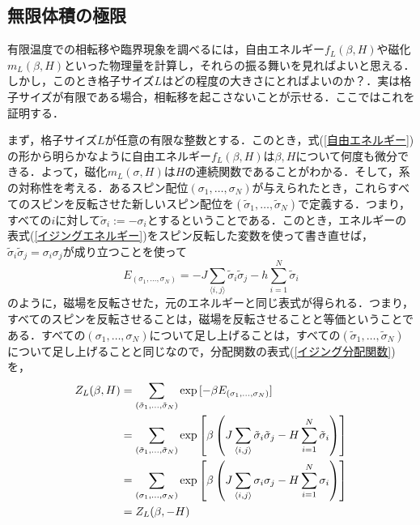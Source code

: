 \documentclass[a4paper,11pt]{jsreport}
\begin{document}
\subsection{無限体積の極限}
有限温度での相転移や臨界現象を調べるには，自由エネルギー$f_L(\beta, H)$や磁化$m_L(\beta, H)$といった物理量を計算し，それらの振る舞いを見ればよいと思える．しかし，このとき格子サイズ$L$はどの程度の大きさにとればよいのか？．実は格子サイズが有限である場合，相転移を起こさないことが示せる．ここではこれを証明する．\par
まず，格子サイズ$L$が任意の有限な整数とする．このとき，式(\ref{自由エネルギー})の形から明らかなように自由エネルギー$f_L(\beta, H)$は$\beta, H$について何度も微分できる．よって，磁化$m_L(\sigma, H)$は$H$の連続関数であることがわかる．そして，系の対称性を考える．あるスピン配位$(\sigma_1,\dots,\sigma_N)$が与えられたとき，これらすべてのスピンを反転させた新しいスピン配位を$(\tilde{\sigma}_1,\dots,\tilde{\sigma}_N)$で定義する．つまり，すべての$i$に対して$\tilde{\sigma}_i := -\sigma_i$とするということである．このとき，エネルギーの表式(\ref{イジングエネルギー})をスピン反転した変数を使って書き直せば，$\tilde{\sigma}_i \tilde{\sigma}_j = \sigma_i \sigma_j$が成り立つことを使って
\begin{equation}
  E_{(\sigma_1,\dots,\sigma_N)} = -J \sum_{\langle i,j \rangle} \tilde{\sigma}_i \tilde{\sigma}_j -h \sum_{i=1}^{N} \tilde{\sigma}_i
\end{equation}
のように，磁場を反転させた，元のエネルギーと同じ表式が得られる．つまり，すべてのスピンを反転させることは，磁場を反転させることと等価ということである．すべての$(\sigma_1,\dots,\sigma_N)$について足し上げることは，すべての$(\tilde{\sigma}_1,\dots,\tilde{\sigma}_N)$について足し上げることと同じなので，分配関数の表式(\ref{イジング分配関数})を，
\begin{align}
  Z_L(\beta, H)
   & = \sum_{(\tilde{\sigma}_1,\dots,\tilde{\sigma}_N)} \exp{[-\beta E_{(\sigma_1,\dots,\sigma_N)}]} \notag                                                                                               \\
   & = \sum_{(\tilde{\sigma}_1,\dots,\tilde{\sigma}_N)} \exp{\left[ \beta\left( J \sum_{\langle i,j \rangle} \tilde{\sigma}_i \tilde{\sigma}_j -H \sum_{i=1}^{N} \tilde{\sigma}_i \right) \right]} \notag \\
   & = \sum_{(\sigma_1,\dots,\sigma_N)} \exp{\left[ \beta\left( J \sum_{\langle i,j \rangle} \sigma_i \sigma_j -H \sum_{i=1}^{N} \sigma_i \right) \right]} \notag                                         \\
   & = Z_L(\beta, -H)
\end{align}
\end{document}
